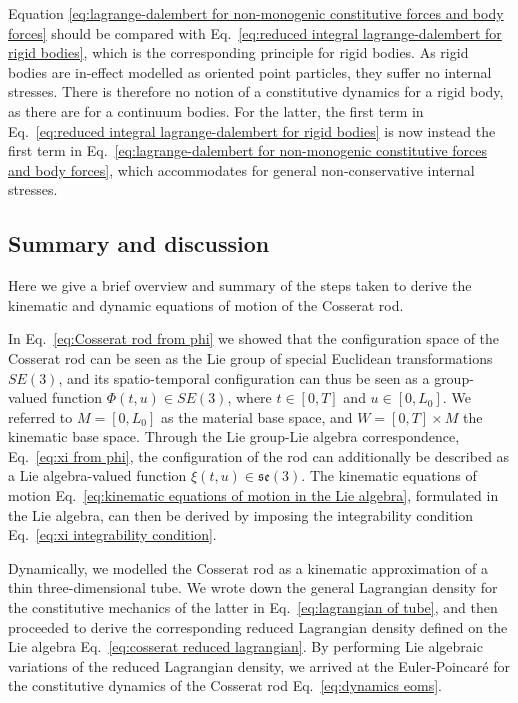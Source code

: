 Equation \ref{eq:lagrange-dalembert for non-monogenic constitutive forces and body forces} should be compared with Eq.~\ref{eq:reduced integral lagrange-dalembert for rigid bodies}, which is the corresponding principle for rigid bodies. As rigid bodies are in-effect modelled as oriented point particles, they suffer no internal stresses. There is therefore no notion of a constitutive dynamics for a rigid body, as there are for a continuum bodies. For the latter, the first term in Eq.~\ref{eq:reduced integral lagrange-dalembert for rigid bodies} is now instead the first term in Eq.~\ref{eq:lagrange-dalembert for non-monogenic constitutive forces and body forces}, which accommodates for general non-conservative internal stresses.


\subsection{Summary and discussion}

Here we give a brief overview and summary of the steps taken to derive the kinematic and dynamic equations of motion of the Cosserat rod.

In Eq.~\ref{eq:Cosserat rod from phi} we showed that the configuration space of the Cosserat rod can be seen as the Lie group of special Euclidean transformations $SE(3)$, and its spatio-temporal configuration can thus be seen as a group-valued function $\Phi(t,u) \in SE(3)$, where $t \in [0, T]$ and $u \in [0, L_0]$. We referred to $M = [0, L_0]$ as the material base space, and $W = [0, T] \times M$ the kinematic base space. Through the Lie group-Lie algebra correspondence, Eq.~\ref{eq:xi from phi}, the configuration of the rod can additionally be described as a Lie algebra-valued function $\xi(t,u) \in \mathfrak{se}(3)$. The kinematic equations of motion Eq.~\ref{eq:kinematic equations of motion in the Lie algebra}, formulated in the Lie algebra, can then be derived by imposing the integrability condition Eq.~\ref{eq:xi integrability condition}.

Dynamically, we modelled the Cosserat rod as a kinematic approximation of a thin three-dimensional tube. We wrote down the general Lagrangian density for the constitutive mechanics of the latter in Eq.~\ref{eq:lagrangian of tube}, and then proceeded to derive the corresponding reduced Lagrangian density defined on the Lie algebra Eq.~\ref{eq:cosserat reduced lagrangian}. By performing Lie algebraic variations of the reduced Lagrangian density, we arrived at the Euler-Poincaré for the constitutive dynamics of the Cosserat rod Eq.~\ref{eq:dynamics eoms}.

